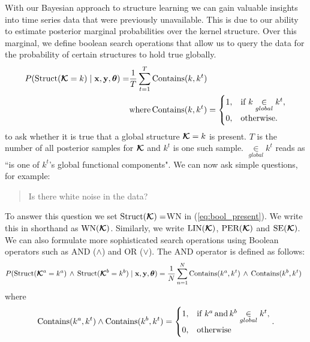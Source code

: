 With our Bayesian approach to structure learning we can gain valuable insights
into time series data that were previously unavailable.
This is due to our ability to estimate posterior marginal probabilities over the kernel structure.
Over this marginal, we define boolean search operations that allow us to query the data
for the probability of certain structures to hold true globally.
\begin{align}
\label{eq:bool_present}
P(\text{Struct}(\bm{\mathcal{K}}=k) \mid \mathbf{x},\mathbf{y},\bm{\theta}) =& \frac{1}{T}
\sum\limits_{t=1}^T \text{Contains}(k,k^t)\\
&\text{where}\, \text{Contains}(k,k^t) = \begin{cases}
  1, & \text{if } k \underset{global}{\in} k^t, \\
  0, & \text{otherwise}.
\end{cases} 
\end{align}
to ask whether it is true that a global structure $\bm{\mathcal{K}}=k$ is present. $T$
is the number of all posterior samples for $\bm{\mathcal{K}}$ and $k^t$ is one such
sample. $\underset{global}{\in} k^t$ reads as ``is one of $k^t$'s global
functional components".
We can now ask simple questions, for example:
\begin{quotation}
Is there white noise in the data?
\end{quotation}
To answer this question we set $\text{Struct}(\bm{\mathcal{K}}) = $WN in (\ref{eq:bool_present}). We write this in
shorthand as $\text{WN}(\bm{\mathcal{K}})$. Similarly, we write $\text{LIN}(\bm{\mathcal{K}})$, $\text{PER}(\bm{\mathcal{K}})$ and $\text{SE}(\bm{\mathcal{K}})$. 
We can also formulate more sophisticated search operations using Boolean operators such as AND ($\land$) and OR ($\lor$).
The AND operator is defined as follows:
\[
P(\text{Struct}(\bm{\mathcal{K}}^a=k^a)\, \land\, \text{Struct}(\bm{\mathcal{K}}^b=k^b) \mid \mathbf{x},\mathbf{y}, \bm{\theta})  = \frac{1}{N}
\sum\limits_{n=1}^N \text{Contains}(k^a,k^t)\, \land \, \text{Contains}(k^b,k^t)\;\;
\]
where
\[
\text{Contains}(k^a,k^t) \land \text{Contains}(k^b,k^t) = \begin{cases}
  1, & \text{if } k^a\, \text{and}\, k^b  \underset{global}{\in} k^t, \\
  0, & \text{otherwise}\end{cases}.
\]


